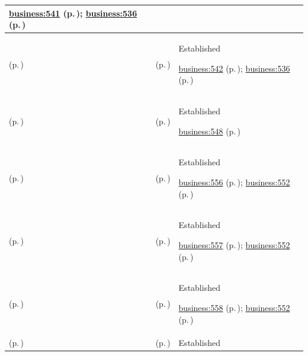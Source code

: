 \begin{longtable}{|>{\raggedright\arraybackslash}p{0.27\TableWidth}|>{\raggedright\arraybackslash}p{0.27\TableWidth}|>{\raggedright\arraybackslash}p{0.46\TableWidth}|}
 \hyperref[rad:business:538]{business:541} (p.\,\pageref{rad:business:538}); \hyperref[rad:business:536]{business:536} (p.\,\pageref{rad:business:536})\\\hline
\nameref{cap:bc-clinical-safety-management} (p.\,\pageref{cap:bc-clinical-safety-management}) & \nameref{cap:bc-clinical-risk-response-management} (p.\,\pageref{cap:bc-clinical-risk-response-management}) & Established

 \hyperref[rad:business:538]{business:542} (p.\,\pageref{rad:business:538}); \hyperref[rad:business:536]{business:536} (p.\,\pageref{rad:business:536})\\\hline
\nameref{cap:bc-clinical-quality-safety-improvement} (p.\,\pageref{cap:bc-clinical-quality-safety-improvement}) & \nameref{cap:bc-clinical-quality-management} (p.\,\pageref{cap:bc-clinical-quality-management}) & Established

 \hyperref[rad:business:548]{business:548} (p.\,\pageref{rad:business:548})\\\hline
\nameref{cap:bc-clinical-quality-management} (p.\,\pageref{cap:bc-clinical-quality-management}) & \nameref{cap:bc-clinical-quality-criteria-management} (p.\,\pageref{cap:bc-clinical-quality-criteria-management}) & Established

 \hyperref[rad:business:554]{business:556} (p.\,\pageref{rad:business:554}); \hyperref[rad:business:552]{business:552} (p.\,\pageref{rad:business:552})\\\hline
\nameref{cap:bc-clinical-quality-management} (p.\,\pageref{cap:bc-clinical-quality-management}) & \nameref{cap:bc-clinical-quality-evidence-management} (p.\,\pageref{cap:bc-clinical-quality-evidence-management}) & Established

 \hyperref[rad:business:554]{business:557} (p.\,\pageref{rad:business:554}); \hyperref[rad:business:552]{business:552} (p.\,\pageref{rad:business:552})\\\hline
\nameref{cap:bc-clinical-quality-management} (p.\,\pageref{cap:bc-clinical-quality-management}) & \nameref{cap:bc-clinical-quality-review-assessment-management} (p.\,\pageref{cap:bc-clinical-quality-review-assessment-management}) & Established

 \hyperref[rad:business:554]{business:558} (p.\,\pageref{rad:business:554}); \hyperref[rad:business:552]{business:552} (p.\,\pageref{rad:business:552})\\\hline
\nameref{cap:bc-clinical-quality-management} (p.\,\pageref{cap:bc-clinical-quality-management}) & \nameref{cap:bc-clinical-quality-reporting} (p.\,\pageref{cap:bc-clinical-quality-reporting}) & Established


\end{longtable}

